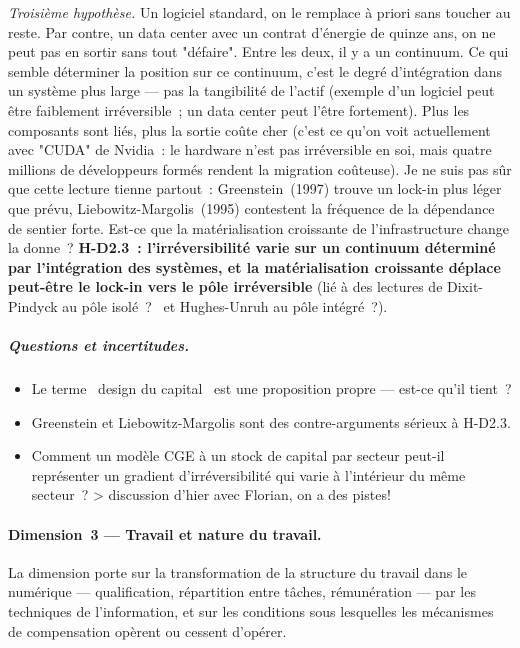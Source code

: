 \emph{Troisi\`eme hypoth\`ese.} Un logiciel standard, on le remplace à priori sans toucher au reste. Par contre, un data center avec un contrat d'\'energie de quinze ans, on ne peut pas en sortir sans tout "d\'efaire". Entre les deux, il y a un continuum. Ce qui semble d\'eterminer la position sur ce continuum, c'est le degr\'e d'int\'egration dans un syst\`eme plus large --- pas la tangibilit\'e de l'actif (exemple d'un logiciel peut \^etre faiblement irr\'eversible~; un data center peut l'\^etre fortement). Plus les composants sont li\'es, plus la sortie co\^ute cher (c'est ce qu'on voit actuellement avec "CUDA" de Nvidia~: le hardware n'est pas irr\'eversible en soi, mais quatre millions de d\'eveloppeurs form\'es rendent la migration co\^uteuse). Je ne suis pas s\^ur que cette lecture tienne partout~: Greenstein~(1997) trouve un lock-in plus l\'eger que pr\'evu, Liebowitz-Margolis~(1995) contestent la fr\'equence de la d\'ependance de sentier forte. Est-ce que la mat\'erialisation croissante de l'infrastructure change la donne~? \textbf{H-D2.3~: l'irr\'eversibilit\'e varie sur un continuum d\'etermin\'e par l'int\'egration des systèmes, et la mat\'erialisation croissante d\'eplace peut-\^etre le lock-in vers le p\^ole irr\'eversible} (lié à des lectures de Dixit-Pindyck au p\^ole isol\'e~?~ et Hughes-Unruh au p\^ole int\'egr\'e~?).

\subparagraph{Questions et incertitudes.}
\begin{itemize}
\item Le terme \og~design du capital~\fg{} est une proposition propre --- est-ce qu'il tient~? 
\item Greenstein et Liebowitz-Margolis sont des contre-arguments s\'erieux \`a H-D2.3. 
\item Comment un mod\`ele CGE \`a un stock de capital par secteur peut-il repr\'esenter un gradient d'irr\'eversibilit\'e qui varie \`a l'int\'erieur du m\^eme secteur~? > discussion d'hier avec Florian, on a des pistes!
\end{itemize}


\paragraph{Dimension~3 --- Travail et nature du travail.}
La dimension porte sur la transformation de la structure du travail dans le numérique --- qualification, r\'epartition entre t\^aches, r\'emun\'eration --- par les techniques de l'information, et sur les conditions sous lesquelles les m\'ecanismes de compensation op\`erent ou cessent d'op\'erer.

